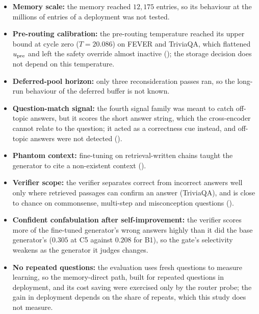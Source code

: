 \begin{itemize}
    \item \textbf{Memory scale:} the memory reached $12{,}175$ entries, so its behaviour at the millions of entries of a deployment was not tested.
    \item \textbf{Pre-routing calibration:} the pre-routing temperature reached its upper bound at cycle zero ($T = 20.086$) on FEVER and TriviaQA, which flattened $u_{\text{pre}}$ and left the safety override almost inactive (); the storage decision does not depend on this temperature.
    \item \textbf{Deferred-pool horizon:} only three reconsideration passes ran, so the long-run behaviour of the deferred buffer is not known.
    \item \textbf{Question-match signal:} the fourth signal family was meant to catch off-topic answers, but it scores the short answer string, which the cross-encoder cannot relate to the question; it acted as a correctness cue instead, and off-topic answers were not detected ().
    \item \textbf{Phantom context:} fine-tuning on retrieval-written chains taught the generator to cite a non-existent context ().
    \item \textbf{Verifier scope:} the verifier separates correct from incorrect answers well only where retrieved passages can confirm an answer (TriviaQA), and is close to chance on commonsense, multi-step and misconception questions ().
    \item \textbf{Confident confabulation after self-improvement:} the verifier scores more of the fine-tuned generator's wrong answers highly than it did the base generator's ($0.305$ at C5 against $0.208$ for B1), so the gate's selectivity weakens as the generator it judges changes.
    \item \textbf{No repeated questions:} the evaluation uses fresh questions to measure learning, so the memory-direct path, built for repeated questions in deployment, and its cost saving were exercised only by the router probe; the gain in deployment depends on the share of repeats, which this study does not measure.
\end{itemize}

